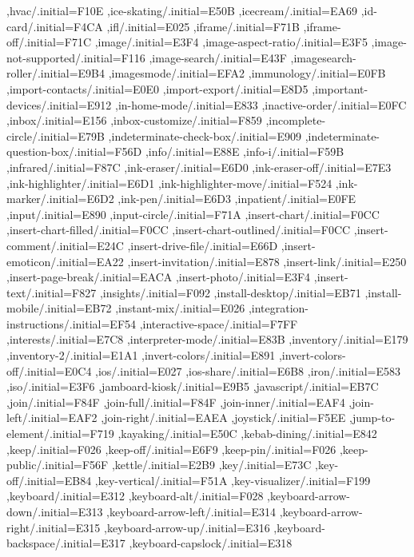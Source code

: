 { ,hvac/.initial=F10E
 ,ice-skating/.initial=E50B
 ,icecream/.initial=EA69
 ,id-card/.initial=F4CA
 ,ifl/.initial=E025
 ,iframe/.initial=F71B
 ,iframe-off/.initial=F71C
 ,image/.initial=E3F4
 ,image-aspect-ratio/.initial=E3F5
 ,image-not-supported/.initial=F116
 ,image-search/.initial=E43F
 ,imagesearch-roller/.initial=E9B4
 ,imagesmode/.initial=EFA2
 ,immunology/.initial=E0FB
 ,import-contacts/.initial=E0E0
 ,import-export/.initial=E8D5
 ,important-devices/.initial=E912
 ,in-home-mode/.initial=E833
 ,inactive-order/.initial=E0FC
 ,inbox/.initial=E156
 ,inbox-customize/.initial=F859
 ,incomplete-circle/.initial=E79B
 ,indeterminate-check-box/.initial=E909
 ,indeterminate-question-box/.initial=F56D
 ,info/.initial=E88E
 ,info-i/.initial=F59B
 ,infrared/.initial=F87C
 ,ink-eraser/.initial=E6D0
 ,ink-eraser-off/.initial=E7E3
 ,ink-highlighter/.initial=E6D1
 ,ink-highlighter-move/.initial=F524
 ,ink-marker/.initial=E6D2
 ,ink-pen/.initial=E6D3
 ,inpatient/.initial=E0FE
 ,input/.initial=E890
 ,input-circle/.initial=F71A
 ,insert-chart/.initial=F0CC
 ,insert-chart-filled/.initial=F0CC
 ,insert-chart-outlined/.initial=F0CC
 ,insert-comment/.initial=E24C
 ,insert-drive-file/.initial=E66D
 ,insert-emoticon/.initial=EA22
 ,insert-invitation/.initial=E878
 ,insert-link/.initial=E250
 ,insert-page-break/.initial=EACA
 ,insert-photo/.initial=E3F4
 ,insert-text/.initial=F827
 ,insights/.initial=F092
 ,install-desktop/.initial=EB71
 ,install-mobile/.initial=EB72
 ,instant-mix/.initial=E026
 ,integration-instructions/.initial=EF54
 ,interactive-space/.initial=F7FF
 ,interests/.initial=E7C8
 ,interpreter-mode/.initial=E83B
 ,inventory/.initial=E179
 ,inventory-2/.initial=E1A1
 ,invert-colors/.initial=E891
 ,invert-colors-off/.initial=E0C4
 ,ios/.initial=E027
 ,ios-share/.initial=E6B8
 ,iron/.initial=E583
 ,iso/.initial=E3F6
 ,jamboard-kiosk/.initial=E9B5
 ,javascript/.initial=EB7C
 ,join/.initial=F84F
 ,join-full/.initial=F84F
 ,join-inner/.initial=EAF4
 ,join-left/.initial=EAF2
 ,join-right/.initial=EAEA
 ,joystick/.initial=F5EE
 ,jump-to-element/.initial=F719
 ,kayaking/.initial=E50C
 ,kebab-dining/.initial=E842
 ,keep/.initial=F026
 ,keep-off/.initial=E6F9
 ,keep-pin/.initial=F026
 ,keep-public/.initial=F56F
 ,kettle/.initial=E2B9
 ,key/.initial=E73C
 ,key-off/.initial=EB84
 ,key-vertical/.initial=F51A
 ,key-visualizer/.initial=F199
 ,keyboard/.initial=E312
 ,keyboard-alt/.initial=F028
 ,keyboard-arrow-down/.initial=E313
 ,keyboard-arrow-left/.initial=E314
 ,keyboard-arrow-right/.initial=E315
 ,keyboard-arrow-up/.initial=E316
 ,keyboard-backspace/.initial=E317
 ,keyboard-capslock/.initial=E318
}
